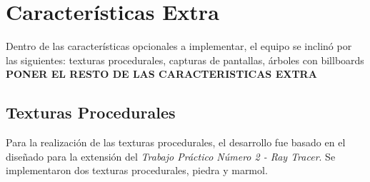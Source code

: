 \documentclass[a4paper,11pt]{article}
\begin{document}
\section{Características Extra}
\label{caracteristicas}

Dentro de las características opcionales a implementar, el equipo se inclinó
por las siguientes: texturas procedurales, capturas de pantallas, árboles con
billboards \textbf{PONER EL RESTO DE LAS CARACTERISTICAS EXTRA}

\subsection{Texturas Procedurales}

Para la realización de las texturas procedurales, el desarrollo fue basado en
el diseñado para la extensión del \textit{Trabajo Práctico Número 2 - Ray
Tracer}.  Se implementaron dos texturas procedurales, piedra y marmol.
\end{document}
